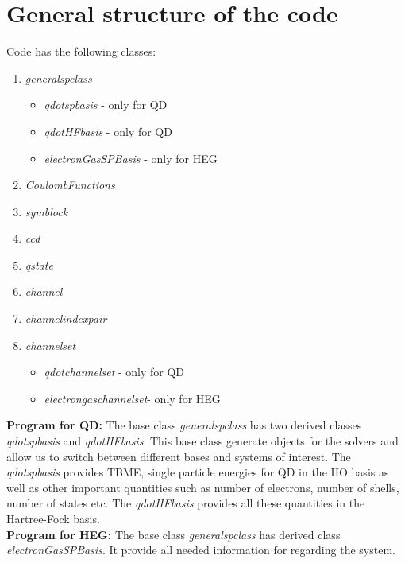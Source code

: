 \documentclass[twoside,english]{uiofysmaster}
\theoremstyle{definition}
\begin{document}
\section{General structure of the code}\label{sec:impl1}
Code has the following classes:
\begin{enumerate}
\item  \textit{generalspclass} 
	\begin{itemize}
	\item \textit{qdotspbasis} - only for QD
	\item \textit{qdotHFbasis} - only for QD
	\item \textit{electronGasSPBasis} - only for HEG
	\end{itemize}
\item \textit{CoulombFunctions}	
\item \textit{symblock}
\item \textit{ccd}
\item \textit{qstate}
\item \textit{channel}
\item \textit{channelindexpair}
\item \textit{channelset}

\begin{itemize}
	\item \textit{qdotchannelset} - only for QD
	\item \textit{electrongaschannelset}- only for HEG
\end{itemize}
\end{enumerate}
\textbf{Program for QD:}
The base class \textit{generalspclass} has two derived classes \textit{qdotspbasis} and \textit{qdotHFbasis}. This base class generate objects for the solvers and allow us to switch between different bases and systems of interest. The \textit{qdotspbasis} provides TBME, single particle energies for QD in the HO basis as well as other important quantities such as number of electrons, number of shells, number of states etc. The \textit{qdotHFbasis} provides all these quantities in the Hartree-Fock basis. \\
\textbf{Program for HEG:}
The base class \textit{generalspclass} has derived class \textit{electronGasSPBasis}. It provide all needed information for regarding the system.
\end{document}
